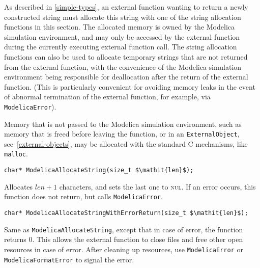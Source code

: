 As described in \cref{simple-types}, an external function wanting to return a newly constructed string must allocate this string with one of the string allocation functions in this section.
The allocated memory is owned by the Modelica simulation environment, and may only be accessed by the external function during the currently executing external function call.
The string allocation functions can also be used to allocate temporary strings that are not returned from the external function, with the convenience of the Modelica simulation environment being responsible for deallocation after the return of the external function.
(This is particularly convenient for avoiding memory leaks in the event of abnormal termination of the external function, for example, via {\lstinline[language=C]!ModelicaError!}).

\begin{nonnormative}
Memory that is not passed to the Modelica simulation environment, such as memory that is freed before leaving the function, or in an {\lstinline!ExternalObject!}, see~\cref{external-objects}, may be allocated with the standard C mechanisms, like {\lstinline[language=C]!malloc!}.
\end{nonnormative}

\begin{functiondefinition}[ModelicaAllocateString]
\begin{synopsis}[C]\begin{lstlisting}
char* ModelicaAllocateString(size_t $\mathit{len}$);
\end{lstlisting}\end{synopsis}
\begin{semantics}
Allocates $\mathit{len}+1$ characters, and sets the last one to \textsc{nul}.
If an error occurs, this function does not return, but calls {\lstinline[language=C]!ModelicaError!}.
\end{semantics}
\end{functiondefinition}

\begin{functiondefinition}[ModelicaAllocateStringWithErrorReturn]
\begin{synopsis}[C]\begin{lstlisting}
char* ModelicaAllocateStringWithErrorReturn(size_t $\mathit{len}$);
\end{lstlisting}\end{synopsis}
\begin{semantics}
Same as {\lstinline[language=C]!ModelicaAllocateString!}, except that in case of error, the function returns 0.
This allows the external function to close files and free other open resources in case of error.
After cleaning up resources, use {\lstinline[language=C]!ModelicaError!} or {\lstinline[language=C]!ModelicaFormatError!} to signal the error.
\end{semantics}
\end{functiondefinition}

